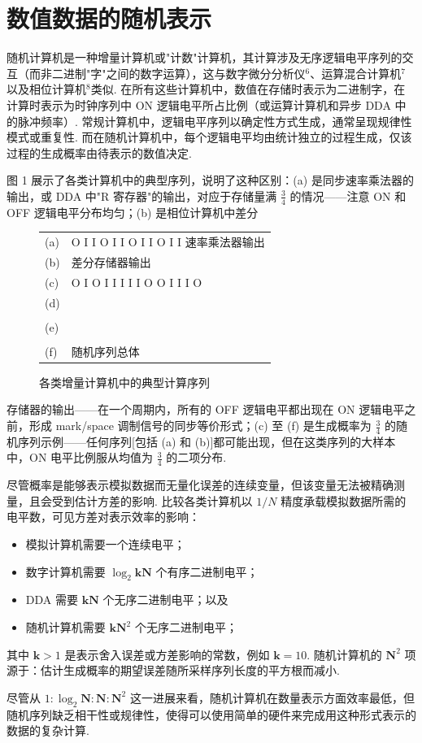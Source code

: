 \section{数值数据的随机表示}\label{stochastic-representation-of-numerical-data}

随机计算机是一种增量计算机或"计数"计算机，其计算涉及无序逻辑电平序列的交互（而非二进制"字"之间的数字运算），这与数字微分分析仪\(^6\)、运算混合计算机\(^7\)以及相位计算机\(^8\)类似. 在所有这些计算机中，数值在存储时表示为二进制字，在计算时表示为时钟序列中 ON 逻辑电平所占比例（或运算计算机和异步 DDA 中的脉冲频率）. 常规计算机中，逻辑电平序列以确定性方式生成，通常呈现规律性模式或重复性. 而在随机计算机中，每个逻辑电平均由统计独立的过程生成，仅该过程的生成概率由待表示的数值决定.

图 1 展示了各类计算机中的典型序列，说明了这种区别：(a) 是同步速率乘法器的输出，或 DDA 中"R 寄存器"的输出，对应于存储量满 $\frac{3}{4}$ 的情况——注意 ON 和 OFF 逻辑电平分布均匀；(b) 是相位计算机中差分

\begin{figure}[htbp]
    \centering
    \begin{tabular}{ll}
        (a) & O I I O I I O I I O I I 速率乘法器输出 \\
        (b) & 差分存储器输出 \\
        (c) & O I O I I I I I O O I I I O \\
        (d) & \\ \\
        (e) & \\ \\
        (f) & 随机序列总体
    \end{tabular}
    \caption{各类增量计算机中的典型计算序列}
\end{figure}

存储器的输出——在一个周期内，所有的 OFF 逻辑电平都出现在 ON 逻辑电平之前，形成 mark/space 调制信号的同步等价形式；(c) 至 (f) 是生成概率为 $\frac{3}{4}$ 的随机序列示例——任何序列[包括 (a) 和 (b)]都可能出现，但在这类序列的大样本中，ON 电平比例服从均值为 $\frac{3}{4}$ 的二项分布.

尽管概率是能够表示模拟数据而无量化误差的连续变量，但该变量无法被精确测量，且会受到估计方差的影响. 比较各类计算机以 $1/N$ 精度承载模拟数据所需的电平数，可见方差对表示效率的影响：

\begin{itemize}
    \item 模拟计算机需要一个连续电平；
    \item 数字计算机需要 $\log_2 \mathbf{kN}$ 个有序二进制电平；
    \item DDA 需要 $\mathbf{kN}$ 个无序二进制电平；以及
    \item 随机计算机需要 $\mathbf{kN}^2$ 个无序二进制电平；
\end{itemize}

其中 $\mathbf{k} > 1$ 是表示舍入误差或方差影响的常数，例如 $\mathbf{k} = 10$. 随机计算机的 $\mathbf{N}^2$ 项源于：估计生成概率的期望误差随所采样序列长度的平方根而减小.

尽管从 $1 : \log_2\mathbf{N} : \mathbf{N} : \mathbf{N}^2$ 这一进展来看，随机计算机在数量表示方面效率最低，但随机序列缺乏相干性或规律性，使得可以使用简单的硬件来完成用这种形式表示的数据的复杂计算.
